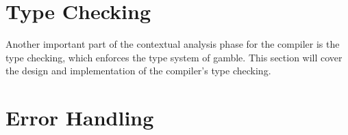\section{Type Checking}
Another important part of the contextual analysis phase for the compiler is the type checking, which enforces the type system of \gls{gamble}.
This section will cover the design and implementation of the compiler's type checking.


\section{Error Handling}
